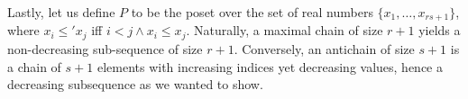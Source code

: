 \documentclass{amsart}
\theoremstyle{plain}
\begin{document}
\begin{enumerate}
        Lastly, let us define $P$ to be the poset over the set of real numbers $\lbrace x_1, \dots, x_{rs + 1} \rbrace$, where $x_i \leq' x_j$ iff $i < j \wedge x_i \leq x_j$.
        Naturally, a maximal chain of size $r + 1$ yields a non-decreasing sub-sequence of size $r + 1$.
        Conversely, an antichain of size $s + 1$ is a chain of $s + 1$ elements with increasing indices yet decreasing values, hence a decreasing subsequence as we wanted to show.
\end{enumerate}
\end{document}

